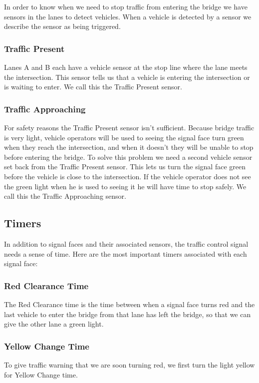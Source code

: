 \documentclass[letterpaper,twoside]{article}
\begin{document}
In order to know when we need to stop traffic from entering the bridge
we have sensors in the lanes to detect vehicles.  When a vehicle is
detected by a sensor we describe the sensor as being triggered.

\subsubsection{Traffic Present}

Lanes A and B each
have a vehicle sensor at the stop line where the lane meets the
intersection.  This sensor tells us that a vehicle is entering
the intersection or is waiting to enter.  We call this the Traffic
Present sensor.

\subsubsection{Traffic Approaching}

For safety reasons the Traffic Present sensor isn't sufficient.
Because bridge traffic is very light, vehicle operators will be
used to seeing the signal face turn green when they reach
the intersection, and when it doesn't they will be unable to stop
before entering the bridge.  To solve this problem we need a
second vehicle sensor set back from the Traffic Present sensor.
This lets us turn the signal face green before the vehicle is
close to the intersection.  If the vehicle operator does not
see the green light when he is used to seeing it he will have
time to stop safely.  We call this the Traffic Approaching sensor.

\subsection{Timers}

In addition to signal faces and their associated sensors, the
traffic control signal needs a sense of time.  Here are the most
important timers associated with each signal face:

\subsubsection{Red Clearance Time}
The Red Clearance time is the time between when a signal face turns red
and the last vehicle to enter the bridge from that lane has left the
bridge, so that we can give the other lane a green light.

\subsubsection{Yellow Change Time}
To give traffic warning that we are soon turning red, we first turn the light
yellow for Yellow Change time.
\end{document}
